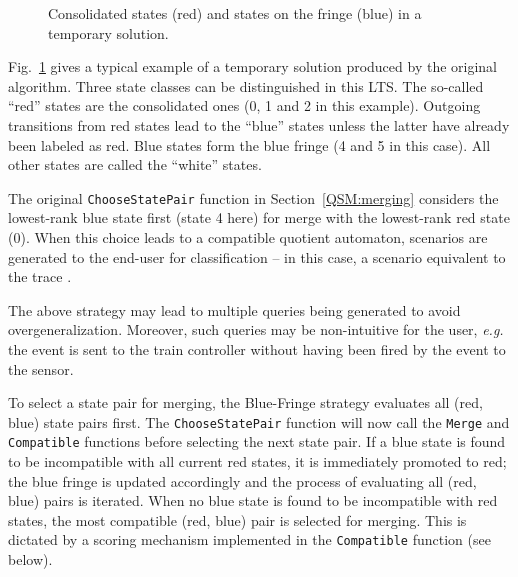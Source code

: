 \begin{figure}
\centering
{}
\caption{Consolidated states (red) and states on the fringe (blue) in a temporary solution\label{Fig:BlueFringe}.}
\end{figure}

Fig.~\ref{Fig:BlueFringe} gives a typical example of a temporary solution produced by the original algorithm. Three state classes can be distinguished in this LTS. The so-called ``red'' states are the consolidated ones (0, 1 and 2 in this example). Outgoing transitions from red states lead to the ``blue'' states unless the latter have already been labeled as red. Blue states form the blue fringe (4 and 5 in this case). All other states are called the ``white'' states. 

The original \texttt{ChooseStatePair} function in Section~\ref{QSM:merging} considers the lowest-rank blue state first (state 4 here) for merge with the lowest-rank red state (0). When this choice leads to a compatible quotient automaton, scenarios are generated to the end-user for classification -- in this case, a scenario equivalent to the trace . 

The above strategy may lead to multiple queries being generated to avoid overgeneralization. Moreover, such queries may be non-intuitive for the user, \textit{e.g.} the  event is sent to the train controller without having been fired by the  event to the sensor.

To select a state pair for merging, the Blue-Fringe strategy evaluates all (red, blue) state pairs first. The \texttt{ChooseStatePair} function will now call the \texttt{Merge} and \texttt{Compatible} functions before selecting the next state pair. If a blue state is found to be incompatible with all current red states, it is immediately promoted to red; the blue fringe is updated accordingly and the process of evaluating all (red, blue) pairs is iterated. When no blue state is found to be incompatible with red states, the most compatible (red, blue) pair is selected for merging. This is dictated by a scoring mechanism implemented in the \texttt{Compatible} function (see below).

